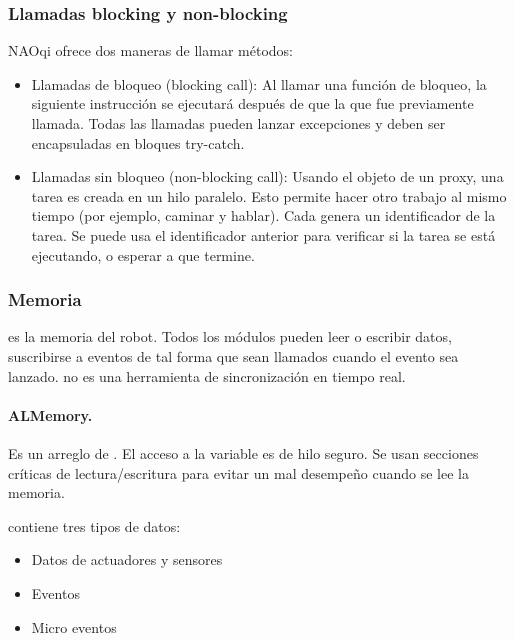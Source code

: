 \subsubsection{Llamadas blocking y non-blocking}
\label{\detokenize{chapter_one/naoqi:llamadas-blocking-y-non-blocking}}
NAOqi ofrece dos maneras de llamar métodos:
\begin{itemize}
\item {} 
Llamadas de bloqueo (blocking call): Al llamar una función de bloqueo, la siguiente instrucción se ejecutará después de que la que fue previamente llamada. Todas las llamadas pueden lanzar excepciones y deben ser encapsuladas en bloques try-catch.

\item {} 
Llamadas sin bloqueo (non-blocking call): Usando el objeto  de un proxy, una tarea es creada en un hilo paralelo. Esto permite hacer otro trabajo al mismo tiempo (por ejemplo, caminar y hablar). Cada  genera un identificador de la tarea. Se puede usa el identificador anterior para verificar si la tarea se está ejecutando, o esperar a que termine.

\end{itemize}


\subsubsection{Memoria}
\label{\detokenize{chapter_one/naoqi:memoria}}
 es la memoria del robot. Todos los módulos pueden leer o escribir
datos, suscribirse a eventos de tal forma que sean llamados cuando el evento
sea lanzado.  no es una herramienta de sincronización en tiempo real.


\paragraph{ALMemory.}
\label{\detokenize{chapter_one/naoqi:almemory}}
Es un arreglo de . El acceso a la variable es de hilo seguro.
Se usan secciones críticas de lectura/escritura para evitar un mal desempeño
cuando se lee la memoria.

 contiene tres tipos de datos:
\begin{itemize}
\item {} 
Datos de actuadores y sensores

\item {} 
Eventos

\item {} 
Micro eventos

\end{itemize}


